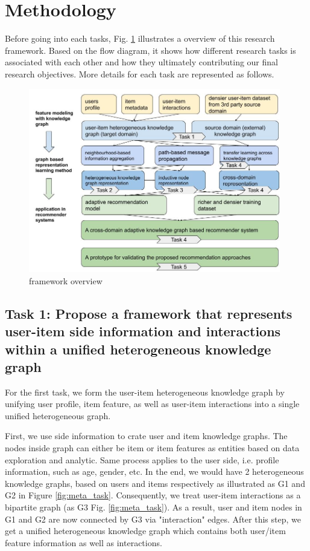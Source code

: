 \section{Methodology}

Before going into each tasks, Fig. \ref{fig:framework} illustrates a overview of this research framework. Based on the flow diagram, it shows how different research tasks is associated with each other and how they ultimately contributing our final research objectives. More details for each task are represented as follows.

\begin{figure}[!ht]
    \centering
    \includegraphics[width=0.98\textwidth]{figs/framework_overview.jpg}
    \caption{framework overview}\label{fig:framework}
\end{figure}

\subsection{Task 1: Propose a framework that represents user-item side information and interactions within a unified heterogeneous knowledge graph}

For the first task, we form the user-item heterogeneous knowledge graph by unifying user profile, item feature, as well as user-item interactions into a single unified heterogeneous graph.

First, we use side information to crate user and item knowledge graphs. The nodes inside graph can either be item or item features as entities based on data exploration and analytic. Same process applies to the user side, i.e. profile information, such as age, gender, etc. In the end, we would have 2 heterogeneous knowledge graphs, based on users and items respectively as illustrated as G1 and G2 in Figure \ref{fig:meta_task}.
Consequently, we treat user-item interactions as a bipartite graph (as G3 Fig. \ref{fig:meta_task}). As a result, user and item nodes in G1 and G2 are now connected by G3 via "interaction" edges. After this step, we get a unified heterogeneous knowledge graph which contains both user/item feature information as well as interactions.


